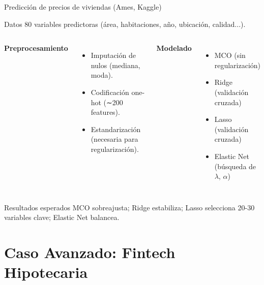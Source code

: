 \documentclass[aspectratio=169, 10pt, xcolor=table]{beamer}
\begin{document}
\begin{frame}{Predicción de precios de viviendas (Ames, Kaggle)}
    \begin{block}{Datos}
        80 variables predictoras (área, habitaciones, año, ubicación, calidad...).
    \end{block}
    \begin{columns}[t]
        \textbf{Preprocesamiento}
        \begin{itemize}
            \item Imputación de nulos (mediana, moda).
            \item Codificación one-hot (∼200 features).
            \item Estandarización (necesaria para regularización).
        \end{itemize}
        \textbf{Modelado}
        \begin{itemize}
            \item MCO (sin regularización)
            \item Ridge (validación cruzada)
            \item Lasso (validación cruzada)
            \item Elastic Net (búsqueda de $\lambda$, $\alpha$)
        \end{itemize}
    \end{columns}
    \vspace{0.3cm}
    \begin{exampleblock}{Resultados esperados}
        MCO sobreajusta; Ridge estabiliza; Lasso selecciona 20-30 variables clave; Elastic Net balancea.
    \end{exampleblock}
\end{frame}

\section{Caso Avanzado: Fintech Hipotecaria}
\end{document}
